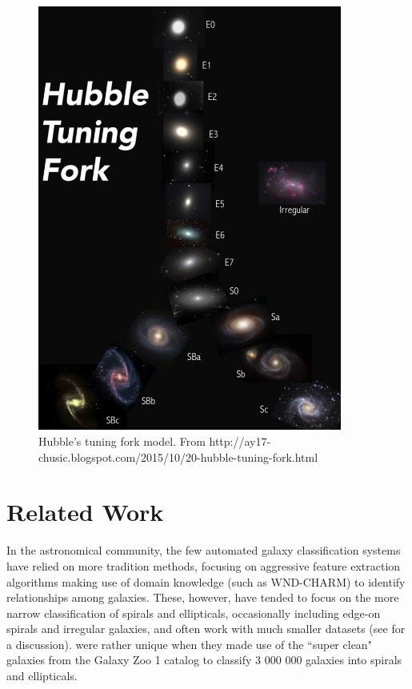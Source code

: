 \documentclass{article}
\begin{document}
\begin{figure}[h]
  \centering
	\includegraphics[width=100mm]{../img/tuningFork.pdf}
  \caption{Hubble's tuning fork model. From http://ay17-chusic.blogspot.com/2015/10/20-hubble-tuning-fork.html}
  \label{fig:tuningFork}
\end{figure}


\section{Related Work}
\label{gen_inst}
In the astronomical community, the few automated galaxy classification systems have relied on more tradition methods, focusing on aggressive feature extraction algorithms making use of domain knowledge (such as WND-CHARM) to identify relationships among galaxies. These, however, have tended to focus on the more narrow classification of spirals and ellipticals, occasionally including edge-on spirals and irregular galaxies, and often work with much smaller datasets (see \citealt{2015MNRAS.450.1441D} for a discussion). \cite{2016ApJS..223...20K} were rather unique when they made use of the ``super clean" galaxies from the Galaxy Zoo 1 catalog \citep{2008MNRAS.389.1179L} to classify 3 000 000 galaxies into spirals and ellipticals.
\end{document}
